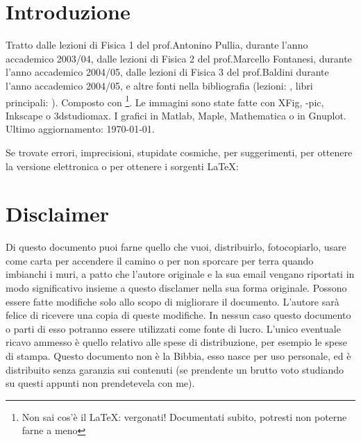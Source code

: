 \sffamily\itshape
\section*{\centering Introduzione}

Tratto dalle lezioni di Fisica 1 del %
prof.\@ Antonino Pullia, durante l'anno accademico 2003/04, dalle lezioni di Fisica 2 del prof.\@ Marcello Fontanesi, durante l'anno accademico 2004/05, dalle lezioni di Fisica 3 del prof.\@ Baldini durante l'anno accademico 2004/05, e altre fonti nella bibliografia (lezioni: \cite{Pullia, Fontanesi, Baldini, Paganoni, Lucchini, Franzoni, Monica, Barney, Maddalena}, libri principali: \cite{Fisica1, Feynm, modern, elettro, ottica, enge, alonso, jackson}). Composto con \LaTeXe\footnote{Non sai cos'è il \LaTeX: vergonati! Documentati subito, potresti non poterne farne a meno}. Le immagini sono state fatte con XFig, \Xy-pic, Inkscape o 3dstudiomax. I grafici in Matlab, Maple, Mathematica o in Gnuplot.
\newline\newline
Ultimo aggiornamento: \today.
\newline\newline
\parbox[c]{\textwidth}{
Se trovate errori, imprecisioni, stupidate cosmiche, per sug\-ge\-ri\-men\-ti, per ottenere la versione elettronica o per ottenere i sorgenti \LaTeX:
\begin{center}
\end{center}
}

\section*{\centering Disclaimer}
Di questo documento puoi farne quello che vuoi, distribuirlo, fotocopiarlo, usare come carta per accendere il camino o per non sporcare per terra quando imbianchi i muri, a patto che l'autore originale e la sua email vengano riportati in modo significativo insieme a questo disclamer nella sua forma originale. Possono essere fatte modifiche solo allo scopo di migliorare il do\-cu\-men\-to. L'autore sarà felice di ricevere una copia di queste modifiche. In nessun caso questo documento o parti di esso potranno essere utilizzati come  fonte di lucro. L'unico eventuale ricavo ammesso è quello relativo alle spese di distribuzione, per esempio le spese di stampa. Questo documento non è la Bibbia, esso nasce per uso personale, ed è distribuito senza garanzia sui contenuti (se prendente un brutto voto studiando su questi appunti non prendetevela con me).
